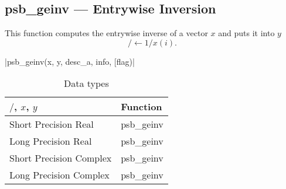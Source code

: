 \clearpage\subsection{psb\_geinv --- Entrywise Inversion}

This function computes the entrywise inverse of a vector $x$ and puts it into
$y$
\[/ \leftarrow 1/x(i).\]

\fortinline|psb_geinv(x, y, desc_a, info, [flag)|

\begin{table}[h]
	\begin{center}
		\begin{tabular}{ll}
			\hline
			$/$, $x$, $y$ & {\bf Function}\\
			\hline
			Short Precision Real & psb\_geinv \\
			Long Precision Real & psb\_geinv \\
			Short Precision Complex & psb\_geinv \\
			Long Precision Complex & psb\_geinv \\
			\hline
		\end{tabular}
	\end{center}
	\caption{Data types\label{tab:f90inv}}
\end{table}

